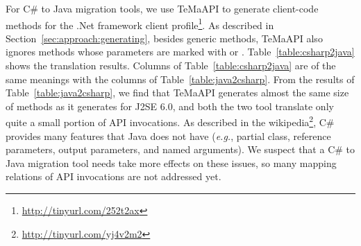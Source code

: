 For C\# to Java migration tools, we use TeMaAPI to generate client-code methods for the .Net framework client profile\footnote{\url{http://tinyurl.com/252t2ax}}. As described in Section~\ref{sec:approach:generating}, besides generic methods, TeMaAPI also ignores methods whose parameters are marked with  or . Table~\ref{table:csharp2java} shows the translation results. Columns of Table~\ref{table:csharp2java} are of the same meanings with the columns of Table~\ref{table:java2csharp}. From the results of Table~\ref{table:java2csharp}, we find that TeMaAPI generates almost the same size of methods as it generates for J2SE 6.0, and both the two tool translate only quite a small portion of API invocations. As described in the wikipedia\footnote{\url{http://tinyurl.com/yj4v2m2}}, C\# provides many features that Java does not have (\emph{e.g.}, partial class, reference parameters, output parameters, and named arguments). We suspect that a C\# to Java migration tool needs take more effects on these issues, so many mapping relations of API invocations are not addressed yet.
